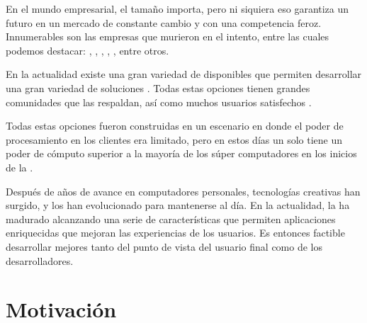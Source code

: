			En el mundo empresarial, el tamaño importa, pero ni siquiera eso garantiza un futuro en un mercado de constante cambio y con una competencia feroz. Innumerables son las empresas que murieron en el intento, entre las cuales podemos destacar: \sega, \kodak, \daewoo, \nokia, \blockbuster, entre otros.

			En la actualidad existe una gran variedad de \frameworksPC \openSourcePC disponibles que permiten desarrollar una gran variedad de soluciones \ecommerceCOM. Todas estas opciones tienen grandes comunidades que las respaldan, así como muchos usuarios satisfechos \citeAllFrameworks. 

			Todas estas opciones fueron construidas en un escenario en donde el poder de procesamiento en los clientes era limitado, pero en estos días un solo \iphone tiene un poder de cómputo superior a la mayoría de los súper computadores en los inicios de la \webINT. 

			Después de años de avance en computadores personales, tecnologías creativas han surgido, y los \webINT \browsersINT han evolucionado para mantenerse al día. En la actualidad, la \webINT ha madurado alcanzando una serie de características que permiten aplicaciones enriquecidas que mejoran las experiencias de los usuarios. Es entonces factible desarrollar \frameworksPC \ecommerceCOM mejores tanto del punto de vista del usuario final como de los desarrolladores.

	\section{Motivación}\label{cap:intro:motivacion}

